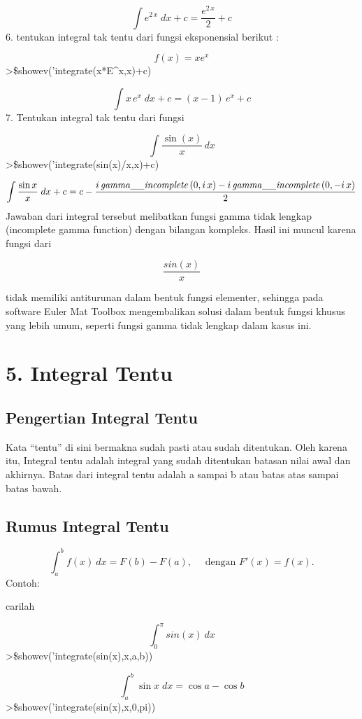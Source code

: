 \documentclass[
]{book}
\begin{document}
\[\int {e^{2\,x}}{\;dx}+c=\frac{e^{2\,x}}{2}+c\]6. tentukan integral tak tentu dari fungsi eksponensial berikut :

\[f(x)=x e^x\]\textgreater\$showev('integrate(x*E\^{}x,x)+c)

\[\int {x\,e^{x}}{\;dx}+c=\left(x-1\right)\,e^{x}+c\]7. Tentukan integral tak tentu dari fungsi

\[\int \frac{\sin(x)}{x} \, dx\]\textgreater\$showev('integrate(sin(x)/x,x)+c)

\[\int {\frac{\sin x}{x}}{\;dx}+c=c-\frac{i\,  {\it gamma\_\_incomplete}\left(0 , i\,x\right)-i\,  {\it gamma\_\_incomplete}\left(0 , -i\,x\right)}{2}\]Jawaban dari integral tersebut melibatkan fungsi gamma tidak lengkap (incomplete gamma function) dengan bilangan kompleks. Hasil ini muncul karena fungsi dari

\[\frac{sin(x)}{x}\]

tidak memiliki antiturunan dalam bentuk fungsi elementer, sehingga pada software Euler Mat Toolbox mengembalikan solusi dalam bentuk fungsi khusus yang lebih umum, seperti fungsi gamma tidak lengkap dalam kasus ini.

\chapter{5. Integral Tentu}\label{integral-tentu}

\section{Pengertian Integral Tentu}\label{pengertian-integral-tentu}

Kata ``tentu'' di sini bermakna sudah pasti atau sudah ditentukan. Oleh karena itu, Integral tentu adalah integral yang sudah ditentukan batasan nilai awal dan akhirnya. Batas dari integral tentu adalah a sampai b atau batas atas sampai batas bawah.

\section{Rumus Integral Tentu}\label{rumus-integral-tentu}

\[\int_a^b f(x)\ dx = F(b)-F(a), \quad \text{ dengan  } F'(x) = f(x).\]Contoh:

carilah

\[\int_0^\pi sin(x)\ dx\]\textgreater\$showev('integrate(sin(x),x,a,b))

\[\int_{a}^{b}{\sin x\;dx}=\cos a-\cos b\]\textgreater\$showev('integrate(sin(x),x,0,pi))
\end{document}
